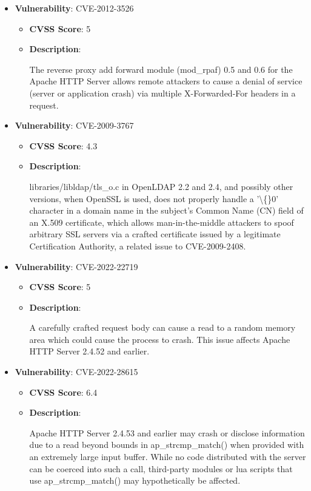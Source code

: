 \documentclass{article}
\begin{document}
\begin{itemize}
        \item \textbf{Vulnerability}: CVE-2012-3526
        \begin{itemize}
            \item \textbf{CVSS Score}:  5 
            \item \textbf{Description}:
            \parbox[t]{0.9\linewidth}{
                \ttfamily The reverse proxy add forward module (mod\_rpaf) 0.5 and 0.6 for the Apache HTTP Server allows remote attackers to cause a denial of service (server or application crash) via multiple X-Forwarded-For headers in a request.
            }
        \end{itemize}
    
        \item \textbf{Vulnerability}: CVE-2009-3767
        \begin{itemize}
            \item \textbf{CVSS Score}:  4.3 
            \item \textbf{Description}:
            \parbox[t]{0.9\linewidth}{
                \ttfamily libraries/libldap/tls\_o.c in OpenLDAP 2.2 and 2.4, and possibly other versions, when OpenSSL is used, does not properly handle a '\textbackslash\{\}0' character in a domain name in the subject's Common Name (CN) field of an X.509 certificate, which allows man-in-the-middle attackers to spoof arbitrary SSL servers via a crafted certificate issued by a legitimate Certification Authority, a related issue to CVE-2009-2408.
            }
        \end{itemize}
    
        \item \textbf{Vulnerability}: CVE-2022-22719
        \begin{itemize}
            \item \textbf{CVSS Score}:  5 
            \item \textbf{Description}:
            \parbox[t]{0.9\linewidth}{
                \ttfamily A carefully crafted request body can cause a read to a random memory area which could cause the process to crash. This issue affects Apache HTTP Server 2.4.52 and earlier.
            }
        \end{itemize}
    
        \item \textbf{Vulnerability}: CVE-2022-28615
        \begin{itemize}
            \item \textbf{CVSS Score}:  6.4 
            \item \textbf{Description}:
            \parbox[t]{0.9\linewidth}{
                \ttfamily Apache HTTP Server 2.4.53 and earlier may crash or disclose information due to a read beyond bounds in ap\_strcmp\_match() when provided with an extremely large input buffer. While no code distributed with the server can be coerced into such a call, third-party modules or lua scripts that use ap\_strcmp\_match() may hypothetically be affected.
            }
        \end{itemize}
    

\end{itemize}
\end{document}
